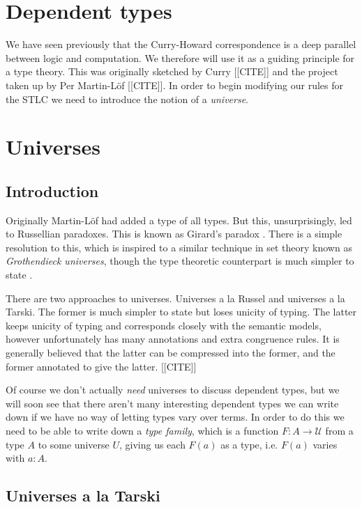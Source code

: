 \section{Dependent types}

We have seen previously that the Curry-Howard correspondence is a deep parallel between logic and computation. We therefore will use it as a guiding principle for a type theory. This was originally sketched by Curry [[CITE]] and the project taken up by Per Martin-L\"of [[CITE]]. In order to begin modifying our rules for the STLC we need to introduce the notion of a \emph{universe}.

\section{Universes}

\subsection{Introduction}

Originally Martin-L\"of had added a type of all types. But this, unsurprisingly, led to Russellian paradoxes. This is known as Girard's paradox \cite{girard1972}. There is a simple resolution to this, which is inspired to a similar technique in set theory known as \emph{Grothendieck universes}, though the type theoretic counterpart is much simpler to state \cite{2008arXiv0810.1279S}.

There are two approaches to universes. Universes a la Russel and universes a la Tarski. The former is much simpler to state but loses unicity of typing. The latter keeps unicity of typing and corresponds closely with the semantic models, however unfortunately has many annotations and extra congruence rules. It is generally believed that the latter can be compressed into the former, and the former annotated to give the latter. [[CITE]]

Of course we don't actually \emph{need} universes to discuss dependent types, but we will soon see that there aren't many interesting dependent types we can write down if we have no way of letting types vary over terms. In order to do this we need to be able to write down a \emph{type family}, which is a function $F : A \to \mathcal{U}$ from a type $A$ to some universe $U$, giving us each $F(a)$ as a type, i.e. $F(a)$ varies with $a:A$.

\subsection{Universes a la Tarski}


